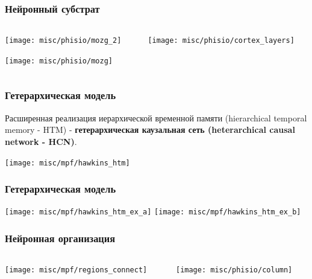 \documentclass[default]{beamer}
\begin{document}
	\begin{frame}
		\frametitle{Нейронный субстрат}
		
		\begin{columns}
			\begin{column}{0.35\textwidth}
				\texttt{[image: misc/phisio/mozg\_2]}
				\par\bigskip
				\hspace{-7mm}\texttt{[image: misc/phisio/mozg]}
			\end{column}
			\begin{column}{0.65\textwidth}
				\texttt{[image: misc/phisio/cortex\_layers]}
			\end{column}
		\end{columns}
		\nocite{*}
		\printbibliography[keyword={column}, resetnumbers=true]
	\end{frame}
		
		
	\begin{frame}
		\frametitle{Гетерархическая модель}
		\scriptsize
		Расширенная реализация иерархической временной памяти (hierarchical temporal memory - HTM) - \textbf{гетерархическая каузальная сеть (heterarchical causal network - HCN)}.
		
		\begin{center}
		\texttt{[image: misc/mpf/hawkins\_htm]}
		\end{center}
		\nocite{*}
		\printbibliography[keyword={starthtm}, resetnumbers=true]
	\end{frame}
		
	\begin{frame}
		\frametitle{Гетерархическая модель}
		
		\begin{center}
		\texttt{[image: misc/mpf/hawkins\_htm\_ex\_a]}
		\texttt{[image: misc/mpf/hawkins\_htm\_ex\_b]}
		\end{center}
		\nocite{*}
		\printbibliography[keyword={hetermem}, resetnumbers=true]
	\end{frame}
		
	\begin{frame}
		\frametitle{Нейронная организация}
		
		\begin{columns}
		\begin{column}{0.65\textwidth}
		\texttt{[image: misc/mpf/regions\_connect]}
		\end{column}
		\begin{column}{0.35\textwidth}
		\texttt{[image: misc/phisio/column]}
		\end{column}
		\end{columns}
		\nocite{*}
		\printbibliography[keyword={simplehtm}, resetnumbers=true]
	\end{frame}
	
\end{document}
